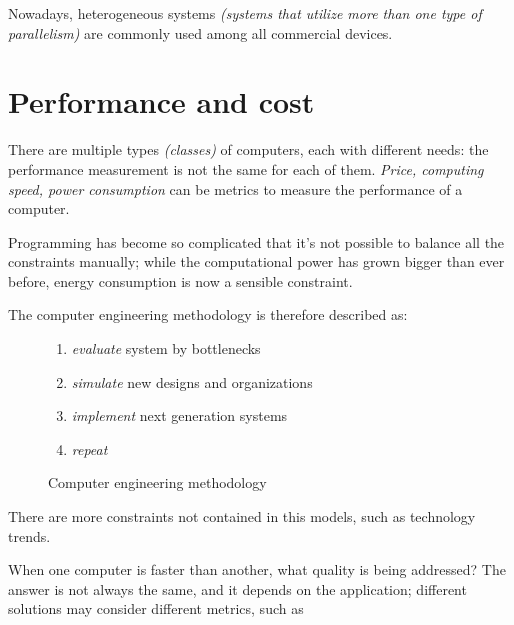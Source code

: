 \documentclass[english]{article}
\begin{document}
Nowadays, heterogeneous systems \textit{(systems that utilize more than one type of parallelism)} are commonly used among all commercial devices.

\clearpage

\section{Performance and cost}

There are multiple types \textit{(classes)} of computers, each with different needs:
the performance measurement is not the same for each of them.
\textit{Price, computing speed, power consumption} can be metrics to measure the performance of a computer.

Programming has become so complicated that it's not possible to balance all the constraints manually;
while the computational power has grown bigger than ever before, energy consumption is now a sensible constraint.

The computer engineering methodology is therefore described as:

\begin{figure}[htbp]
  \bigskip
  \centering
  \begin{minipage}[h]{0.495\textwidth}
    \centering
  \end{minipage}
  \begin{minipage}[h]{0.495\textwidth}
    \begin{enumerate}
      \item \label{enum:methodology-start} \textit{evaluate} system by bottlenecks
      \item \textit{simulate} new designs and organizations
      \item \textit{implement} next generation systems
      \item \textit{repeat}
    \end{enumerate}
  \end{minipage}
  \caption{Computer engineering methodology}
  \label{fig:computer-engineering-methodology}
  \bigskip
\end{figure}

There are more constraints not contained in this models, such as technology trends.

\bigskip
When one computer is faster than another, what quality is being addressed?
The answer is not always the same, and it depends on the application;
different solutions may consider different metrics, such as
\end{document}

